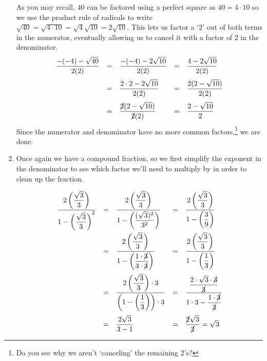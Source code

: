 \begin{ex}
\begin{enumerate}
As you may recall, $40$ can be factored using a perfect square as $40 = 4 \cdot 10$ so we use the product rule of radicals to write $\sqrt{40} = \sqrt{4 \cdot 10} = \sqrt{4} \sqrt{10} = 2 \sqrt{10}$.  This lets us factor a `$2$' out of both terms in the numerator, eventually allowing us to cancel it with a factor of $2$ in the denominator.
\[\begin{array}{rclcl}
 \dfrac{-(-4) - \sqrt{40}}{2(2)} & = &  \dfrac{-(-4) - 2\sqrt{10}}{2(2)} & = &  \dfrac{4  - 2\sqrt{10}}{2(2)} \\ [12pt]
                                 & = &  \dfrac{2 \cdot 2  - 2\sqrt{10}}{2(2)} & = &  \dfrac{2(2  - \sqrt{10})}{2(2)} \\ [12pt]
																& = &  \dfrac{\cancel{2}(2  - \sqrt{10})}{\cancel{2}(2)} & = &  \dfrac{2  - \sqrt{10}}{2} \\
\end{array}\]
Since the numerator and denominator have no more common factors,\footnote{Do you see why we aren't `canceling' the remaining $2$'s?} we are done.

\item  Once again we have a compound fraction, so we first simplify the exponent in the denominator to see which factor we'll need to multiply by in order to clean up the fraction.

\[ \begin{array}{rclcl}

\dfrac{2 \left( \dfrac{\sqrt{3}}{3}\right)}{1 - \left( \dfrac{\sqrt{3}}{3} \right)^2} & = & \dfrac{2 \left( \dfrac{\sqrt{3}}{3}\right)}{1 - \left( \dfrac{(\sqrt{3})^2}{3^2} \right)} & = & \dfrac{2 \left( \dfrac{\sqrt{3}}{3}\right)}{1 - \left( \dfrac{3}{9} \right)}\\ [25pt]
																				
& = & \dfrac{2 \left( \dfrac{\sqrt{3}}{3}\right)}{1 - \left( \dfrac{1 \cdot \cancel{3}}{3 \cdot \cancel{3}} \right)} & = & \dfrac{2 \left( \dfrac{\sqrt{3}}{3}\right)}{1 - \left( \dfrac{1}{3} \right)} \\[25pt]
																
& = & \dfrac{2 \left( \dfrac{\sqrt{3}}{3}\right) \cdot 3}{\left(1 - \left( \dfrac{1}{3} \right)\right) \cdot 3} & = & \dfrac{\dfrac{2 \cdot \sqrt{3} \cdot \cancel{3}}{\cancel{3}}}{1\cdot 3 -  \dfrac{1\cdot \cancel{3}}{\cancel{3}}} \\[25pt]

& = & \dfrac{2 \sqrt{3}}{3 - 1} & = & \dfrac{\cancel{2} \sqrt{3}}{\cancel{2}} = \sqrt{3} \\ \end{array} \]


\end{enumerate}
\end{ex}
